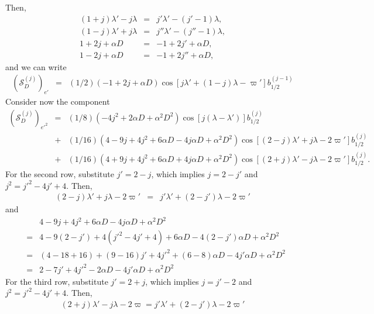 \documentclass [12pt, a4paper] {article}
\begin{document}
Then, 
\begin {eqnarray}
    (1 + j)\lambda' - j\lambda &=& j'\lambda' - (j' - 1)\lambda,
    \\
    (1 - j)\lambda' + j\lambda &=& j''\lambda' - (j'' - 1)\lambda,
    \\
    1 + 2j + \alpha D &=& -1 + 2j' + \alpha D,
    \\
    1 - 2j + \alpha D &=& -1 + 2j'' + \alpha D,
\end {eqnarray}
and we can write 
\begin {eqnarray}
    \left(\mathcal{S}_D^{(j)}\right)_{e'} &=& 
    (1/2)
    \left(
        -1 + 2j + \alpha D
    \right)
    \cos[j\lambda' + (1 - j)\lambda - \varpi']
    b_{1/2}^{(j - 1)}
\end {eqnarray}
Consider now the component
\begin {eqnarray}
    \left(\mathcal{S}_D^{(j)}\right)_{e'^2} &=& 
    (1/8)
    \left(
        -4j^2 + 2\alpha D + \alpha^2D^2
    \right)
    \cos[j(\lambda - \lambda')]
    b_{1/2}^{(j)}
    \\\nonumber
    &+&
    (1/16)
    \left(
        4 - 9j + 4j^2 + 6\alpha D - 4j\alpha D + \alpha^2 D^2
    \right)
    \cos[(2-j)\lambda' + j\lambda - 2\varpi']
    b_{1/2}^{(j)}
    \\\nonumber
    &+&
    (1/16)
    \left(
        4 + 9j + 4j^2 + 6\alpha D + 4j\alpha D + \alpha^2 D^2
    \right)
    \cos[(2+j)\lambda' - j\lambda - 2\varpi']
    b_{1/2}^{(j)}.
\end {eqnarray}
For the second row, substitute $j'= 2 - j$, which implies 
$j= 2 - j'$ and $j^2 = j'^2 - 4j' + 4$. Then, 
\begin {eqnarray}
    (2-j)\lambda' + j\lambda - 2\varpi' 
    &=& 
    j'\lambda' + (2-j')\lambda - 2\varpi'
\end {eqnarray}
and 
\begin {eqnarray}
    &\:&
    4 - 9j + 4j^2 + 6\alpha D - 4j\alpha D + \alpha^2 D^2
    \\\nonumber
    &=& 
    4 - 9(2 - j') + 4(j'^2 - 4j' + 4) + 6\alpha D - 4(2 - j')\alpha D + \alpha^2 D^2
    \\
    &=& 
    (4 - 18 + 16) + (9 - 16)j' + 4j'^2 + (6 - 8)\alpha D - 4j'\alpha D + \alpha^2 D^2
    \\
    &=&
    2 - 7j' + 4j'^2 - 2\alpha D - 4j'\alpha D + \alpha^2 D^2
\end {eqnarray}
For the third row, substitute $j'= 2+ j$, which implies $j= j' - 2$ and 
$j^2 = j'^2 - 4j' + 4$. Then, 
\begin {eqnarray}
    (2+j)\lambda' - j\lambda - 2\varpi 
    = 
    j'\lambda' + (2 - j')\lambda - 2\varpi'
\end {eqnarray}
\end{document}
